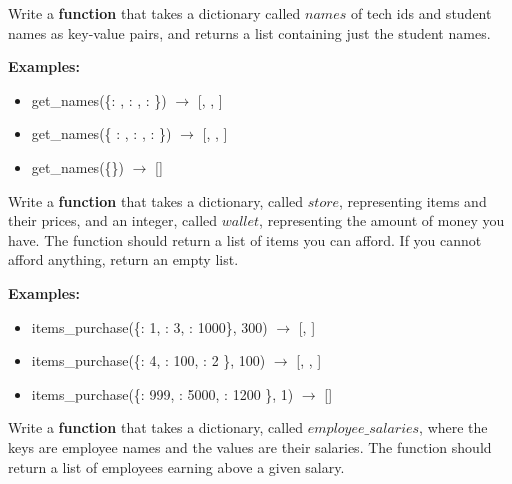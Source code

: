 





	\item 	
		Write a \textbf{function} that takes a dictionary called $names$ of tech ids and student names as key-value pairs, and returns a list containing just the student names. 

		\textbf{Examples:}		
		\begin{itemize}
			\item  get\_names(\{: , : ,
				 :  \}) $\rightarrow$ [, , ]
			\item  get\_names(\{ : , : , 
				:  \}) $\rightarrow$ [, , ]
			\item  get\_names(\{\}) $\rightarrow$ []
		\end{itemize}


\item
	Write a \textbf{function} that takes a dictionary, called $store$, representing items and their prices, and an integer, called $wallet$, 
	representing the amount of money you have. The function should return a list of items you can afford.
	If you cannot afford anything, return an empty list.

	\textbf{Examples:}  
	\begin{itemize}  
		\item items\_purchase(\{: 1, : 3, : 1000\}, 300) $\rightarrow$ [, ]
		\item items\_purchase(\{: 4, : 100, : 2 \}, 100) $\rightarrow$ [, , ]
		\item items\_purchase(\{: 999, : 5000, : 1200 \}, 1) $\rightarrow$ []
	\end{itemize}  


\item
	Write a \textbf{function} that takes a dictionary, called $employee\_salaries$, where the keys are employee names and the values are their salaries. 
	The function should return a list of employees earning above a given salary.
	
